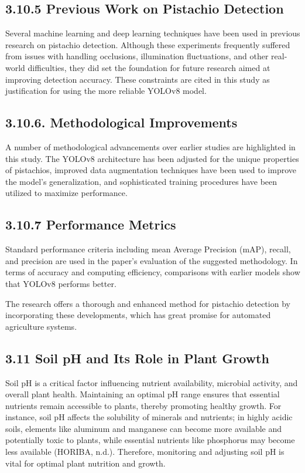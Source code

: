 \documentclass{book} %
\begin{document}
\noindent 
\subsection{3.10.5 Previous Work on Pistachio Detection }

\noindent Several machine learning and deep learning techniques have been used in previous research on pistachio detection. Although these experiments frequently suffered from issues with handling occlusions, illumination fluctuations, and other real-world difficulties, they did set the foundation for future research aimed at improving detection accuracy. These constraints are cited in this study as justification for using the more reliable YOLOv8 model.

\noindent 

\noindent 
\subsection{3.10.6. Methodological Improvements }

\noindent A number of methodological advancements over earlier studies are highlighted in this study. The YOLOv8 architecture has been adjusted for the unique properties of pistachios, improved data augmentation techniques have been used to improve the model's generalization, and sophisticated training procedures have been utilized to maximize performance.

\noindent 
\subsection{3.10.7 Performance Metrics }

\noindent Standard performance criteria including mean Average Precision (mAP), recall, and precision are used in the paper's evaluation of the suggested methodology. In terms of accuracy and computing efficiency, comparisons with earlier models show that YOLOv8 performs better.

\noindent The research offers a thorough and enhanced method for pistachio detection by incorporating these developments, which has great promise for automated agriculture systems.\textbf{}

\noindent 
\subsection{3.11 Soil pH and Its Role in Plant Growth}

\noindent Soil pH is a critical factor influencing nutrient availability, microbial activity, and overall plant health. Maintaining an optimal pH range ensures that essential nutrients remain accessible to plants, thereby promoting healthy growth. For instance, soil pH affects the solubility of minerals and nutrients; in highly acidic soils, elements like aluminum and manganese can become more available and potentially toxic to plants, while essential nutrients like phosphorus may become less available (HORIBA, n.d.). Therefore, monitoring and adjusting soil pH is vital for optimal plant nutrition and growth.
\end{document}
